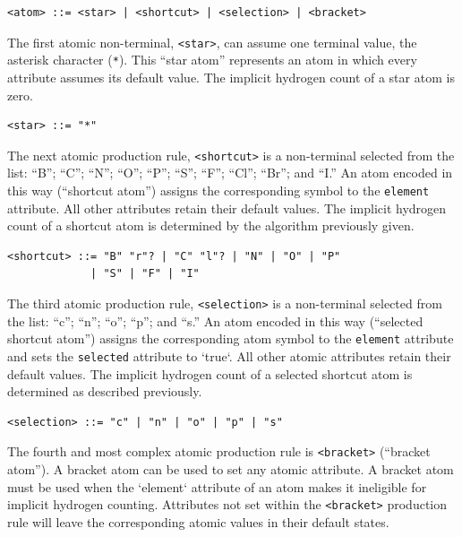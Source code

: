 \documentclass{article}
\def\ttt{\texttt}
\begin{document}
\begin{lstlisting}
<atom> ::= <star> | <shortcut> | <selection> | <bracket>
\end{lstlisting}

The first atomic non-terminal, \ttt{<star>}, can assume one terminal value, the asterisk character (\ttt{*}). This \enquote{star atom} represents an atom in which every attribute assumes its default value. The implicit hydrogen count of a star atom is zero.

\begin{lstlisting}
<star> ::= "*"
\end{lstlisting}

The next atomic production rule, \ttt{<shortcut>} is a non-terminal selected from the list: \enquote{B}; \enquote{C}; \enquote{N}; \enquote{O}; \enquote{P}; \enquote{S}; \enquote{F}; \enquote{Cl}; \enquote{Br}; and \enquote{I.} An atom encoded in this way (\enquote{shortcut atom}) assigns the corresponding symbol to the \ttt{element} attribute. All other attributes retain their default values. The implicit hydrogen count of a shortcut atom is determined by the algorithm previously given.

\begin{lstlisting}
<shortcut> ::= "B" "r"? | "C" "l"? | "N" | "O" | "P"
             | "S" | "F" | "I"
\end{lstlisting}

The third atomic production rule, \ttt{<selection>} is a non-terminal selected from the list: \enquote{c}; \enquote{n}; \enquote{o}; \enquote{p}; and \enquote{s.} An atom encoded in this way (\enquote{selected shortcut atom}) assigns the corresponding atom symbol to the \ttt{element} attribute and sets the \ttt{selected} attribute to `true`. All other atomic attributes retain their default values. The implicit hydrogen count of a selected shortcut atom is determined as described previously.

\begin{lstlisting}
<selection> ::= "c" | "n" | "o" | "p" | "s"
\end{lstlisting}

The fourth and most complex atomic production rule is \ttt{<bracket>} (\enquote{bracket atom}). A bracket atom can be used to set any atomic attribute. A bracket atom must be used when the `element` attribute of an atom makes it ineligible for implicit hydrogen counting. Attributes not set within the \ttt{<bracket>} production rule will leave the corresponding atomic values in their default states.
\end{document}
